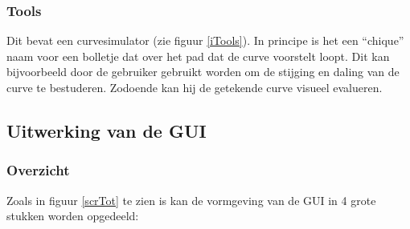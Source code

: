 \documentclass[a4paper,11pt,oneside, titlepage]{article}
\begin{document}
\subsubsection{Tools}
Dit bevat een curvesimulator (zie figuur \ref{iTools}). In principe is het een ``chique'' naam voor een bolletje
dat over het pad dat de curve voorstelt loopt. Dit kan bijvoorbeeld door de gebruiker gebruikt worden om de stijging en daling
van de curve te bestuderen. Zodoende kan hij de getekende curve visueel evalueren.
\subsection{Uitwerking van de GUI}
\subsubsection{Overzicht}
Zoals in figuur \ref{scrTot} te zien is kan de vormgeving van de GUI in 4 grote stukken worden opgedeeld:
\end{document}
